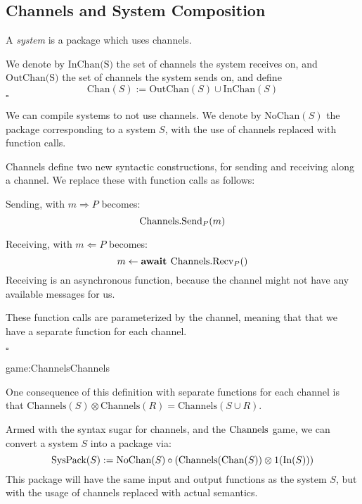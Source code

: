 \subsection{Channels and System Composition}


\begin{definition}[Systems]
A \emph{system} is a package which uses channels.

We denote by $\text{InChan(S)}$ the set of channels the system receives on,
and $\text{OutChan(S)}$ the set of channels the system sends on,
and define
$$
\text{Chan}(S) := \text{OutChan}(S) \cup \text{InChan}(S)
$$
$\square$
\end{definition}

\begin{definition}
We can compile systems to not use channels.
We denote by $\text{NoChan}(S)$ the package corresponding to
a system $S$, with the use of channels replaced with function calls.

Channels define two new syntactic constructions, for sending and receiving
along a channel.
We replace these with function calls as follows:


Sending, with $m \Rightarrow P$ becomes:
$$
\text{Channels}.\text{Send}_P(m)
$$

Receiving, with $m \Leftarrow P$ becomes:
$$
m \gets \textbf{await } \text{Channels}.\text{Recv}_P()
$$
Receiving is an asynchronous function, because the channel might not have
any available messages for us.

These function calls are parameterized by the channel, meaning
that that we have a separate function for each channel.

$\square$
\end{definition}

\begin{game}{game:Channels}{Channels}
\end{game}

One consequence of this definition with separate functions for each channel
is that $\text{Channels}(S) \otimes \text{Channels}(R) = \text{Channels}(S \cup R)$.

Armed with the syntax sugar for channels, and the $\text{Channels}$ game,
we can convert a system $S$ into a package via:
$$
\text{SysPack}(S) := \text{NoChan}(S) \circ (\text{Channels}(\text{Chan}(S)) \otimes 1(\text{In}(S)))
$$
This package will have the same input and output functions as the system $S$,
but with the usage of channels replaced with actual semantics.


